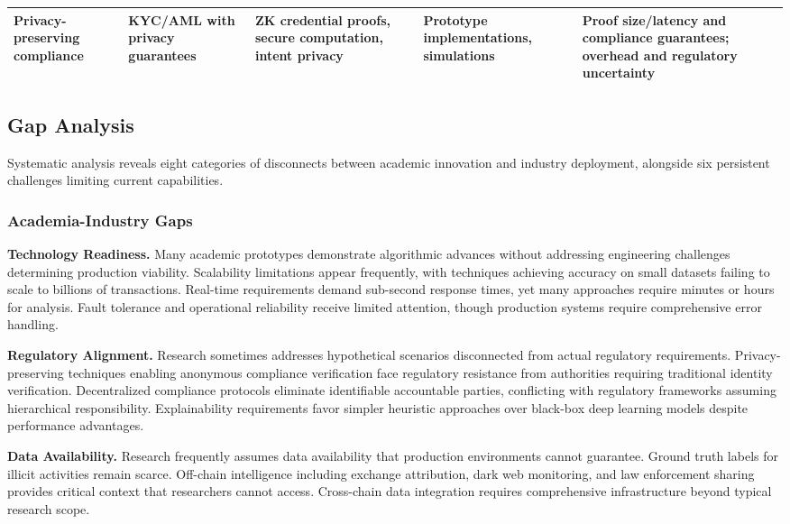 \documentclass[conference,compsoc]{IEEEtran}
\begin{document}
\begin{table}[htbp]
\begin{tabularx}{\textwidth}{XXXXX}
Privacy-preserving compliance \cite{yang2024researchidentitydata,zhang2024blockchainzeroknowledge,wang2024achievingprivacypreservingoptimizer} & KYC/AML with privacy guarantees & ZK credential proofs, secure computation, intent privacy & Prototype implementations, simulations & Proof size/latency and compliance guarantees; overhead and regulatory uncertainty \\
\hline
\end{tabularx}
\end{table}

\subsection{Gap Analysis}

Systematic analysis reveals eight categories of disconnects between academic innovation and industry deployment, alongside six persistent challenges limiting current capabilities.

\subsubsection{Academia-Industry Gaps}

\noindent\textbf{Technology Readiness.} 
Many academic prototypes demonstrate algorithmic advances without addressing engineering challenges determining production viability. Scalability limitations appear frequently, with techniques achieving accuracy on small datasets failing to scale to billions of transactions. Real-time requirements demand sub-second response times, yet many approaches require minutes or hours for analysis. Fault tolerance and operational reliability receive limited attention, though production systems require comprehensive error handling.

\noindent\textbf{Regulatory Alignment.} 
Research sometimes addresses hypothetical scenarios disconnected from actual regulatory requirements. Privacy-preserving techniques enabling anonymous compliance verification face regulatory resistance from authorities requiring traditional identity verification. Decentralized compliance protocols eliminate identifiable accountable parties, conflicting with regulatory frameworks assuming hierarchical responsibility. Explainability requirements favor simpler heuristic approaches over black-box deep learning models despite performance advantages.

\noindent\textbf{Data Availability.} 
Research frequently assumes data availability that production environments cannot guarantee. Ground truth labels for illicit activities remain scarce. Off-chain intelligence including exchange attribution, dark web monitoring, and law enforcement sharing provides critical context that researchers cannot access. Cross-chain data integration requires comprehensive infrastructure beyond typical research scope.
\end{document}
